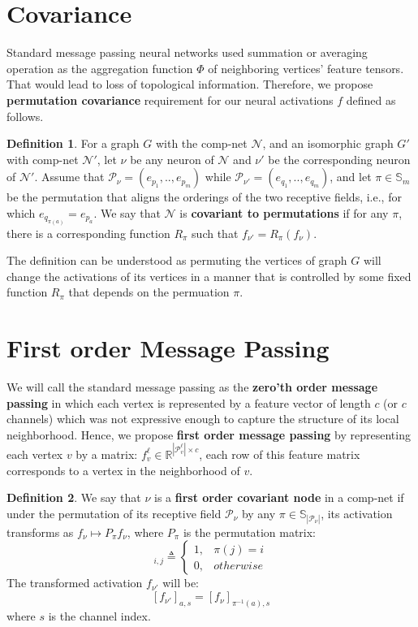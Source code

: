 \documentclass[sigchi]{acmart}
\theoremstyle{definition}
\newtheorem{definition}{Definition}[section]
\theoremstyle{theorem}
\theoremstyle{corollary}
\theoremstyle{lemma}
\theoremstyle{remark}
\theoremstyle{prop}
\begin{document}
\section{Covariance}

Standard message passing neural networks used summation or averaging operation as the aggregation function $\Phi$ of neighboring vertices' feature tensors. That would lead to loss of topological information. Therefore, we propose \textbf{permutation covariance} requirement for our neural activations $f$ defined as follows.
\begin{definition}
For a graph $G$ with the comp-net $\mathcal{N}$, and an isomorphic graph $G'$ with comp-net $\mathcal{N}'$, let $\nu$ be any neuron of $\mathcal{N}$ and $\nu'$ be the corresponding neuron of $\mathcal{N}'$. Assume that $\mathcal{P}_\nu = (e_{p_1}, .., e_{p_m})$ while $\mathcal{P}_{\nu'} = (e_{q_1}, .., e_{q_m})$, and let $\pi \in \mathbb{S}_m$ be the permutation that aligns the orderings of the two receptive fields, i.e., for which $e_{q_{\pi(a)}} = e_{p_a}$. We say that $\mathcal{N}$ is \textbf{covariant to permutations} if for any $\pi$, there is a corresponding function $R_\pi$ such that $f_{\nu'} = R_\pi(f_\nu)$.
\end{definition}
The definition can be understood as permuting the vertices of graph $G$ will change the activations of its vertices in a manner that is controlled by some fixed function $R_\pi$ that depends on the permuation $\pi$.

\section{First order Message Passing}
\label{section:ccn1d}

We will call the standard message passing as the \textbf{zero'th order message passing} in which each vertex is represented by a feature vector of length $c$ (or $c$ channels) which was not expressive enough to capture the structure of its local neighborhood. Hence, we propose \textbf{first order message passing} by representing each vertex $v$ by a matrix: $f_v^\ell \in \mathbb{R}^{|\mathcal{P}_v^\ell| \times c}$, each row of this feature matrix corresponds to a vertex in the neighborhood of $v$.
\begin{definition}
We say that $\nu$ is a \textbf{first order covariant node} in a comp-net if under the permutation of its receptive field $\mathcal{P}_\nu$ by any $\pi \in \mathbb{S}_{|\mathcal{P}_\nu|}$, its activation transforms as $f_\nu \mapsto P_\pi f_\nu$, where $P_\pi$ is the permutation matrix:
\begin{equation}
[P_\pi]_{i, j} \triangleq \begin{cases} 1, & \pi(j) = i  \\ 0, & otherwise \end{cases}
\end{equation}
The transformed activation $f_{\nu'}$ will be:
$$[f_{\nu'}]_{a, s} = [f_\nu]_{\pi^{-1}(a), s}$$
where $s$ is the channel index.
\end{definition}
\end{document}
